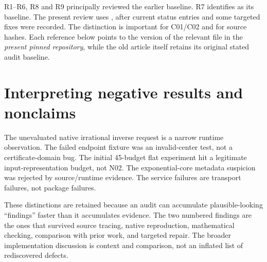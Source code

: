\documentclass[11pt,a4paper]{article}
\newcommand{\code}[1]{\texttt{\detokenize{#1}}}
\begin{document}
R1--R6, R8 and R9 principally reviewed the earlier \code{07a9781} baseline. R7 identifies \code{75de875} as its baseline. The present review uses \code{921387e}, after current status entries and some targeted fixes were recorded. The distinction is important for C01/C02 and for source hashes. Each reference below points to the version of the relevant file in the \emph{present pinned repository}, while the old article itself retains its original stated audit baseline.\cite{review-status,r1,r2,r3,r4,r5,r6,r7,r8,r9}

\section{Interpreting negative results and nonclaims}
The unevaluated native irrational inverse request is a narrow runtime observation. The failed endpoint fixture was an invalid-center test, not a certificate-domain bug. The initial 45-budget flat experiment hit a legitimate input-representation budget, not N02. The exponential-core metadata suspicion was rejected by source/runtime evidence. The service failures are transport failures, not package failures.

These distinctions are retained because an audit can accumulate plausible-looking ``findings'' faster than it accumulates evidence. The two numbered findings are the ones that survived source tracing, native reproduction, mathematical checking, comparison with prior work, and targeted repair. The broader implementation discussion is context and comparison, not an inflated list of rediscovered defects.
\end{document}
